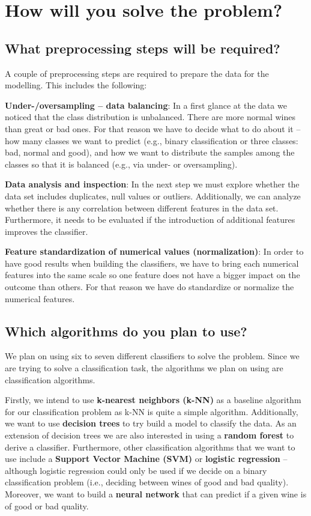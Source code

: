 \documentclass[11pt,titlepage,oneside,openany]{article}
\begin{document}
\section{How will you solve the problem?}
\subsection{What preprocessing steps will be required?}
A couple of preprocessing steps are required to prepare the data for the modelling. This includes the following:

\textbf{Under-/oversampling -- data balancing}: In a first glance at the data we noticed that the class distribution is
unbalanced. There are more normal wines than great or bad ones. For that reason we have to decide what to do about it -- how many classes we want to predict (e.g., binary classification or three classes: bad, normal and good), and how we want to distribute the samples among the classes so that it is balanced (e.g., via under- or oversampling).

\textbf{Data analysis and inspection}: In the next step we must explore whether the data set includes duplicates, null values or outliers. Additionally, we can analyze whether there is any correlation between different features in the data set. Furthermore, it needs to be evaluated if the introduction of additional features improves the classifier.

\textbf{Feature standardization of numerical values (normalization)}: In order to have good results when building the classifiers, we have to bring each numerical features into the same scale so one feature does not have a bigger impact on the outcome than others. For that reason we have do standardize or normalize the numerical features.

\subsection{Which algorithms do you plan to use?}
We plan on using six to seven different classifiers to solve the problem. Since we 
are trying to solve a classification task, the algorithms we plan on using are classification
algorithms.

Firstly, we intend to use \textbf{k-nearest neighbors (k-NN)} as a baseline
algorithm for our classification problem as k-NN is quite a simple algorithm.
Additionally, we want to use \textbf{decision trees} to try build a model to classify the
data. As an extension of decision trees we are also interested in using a \textbf{random forest}
to derive a classifier.
Furthermore, other classification algorithms that we want to use include a \textbf{Support Vector Machine (SVM)}
or \textbf{logistic regression} -- although logistic regression could only be used if we decide on
a binary classification problem (i.e., deciding between wines of good and bad quality).
Moreover, we want to build a \textbf{neural network} that can predict if a given wine is of good or bad quality.
\end{document}
